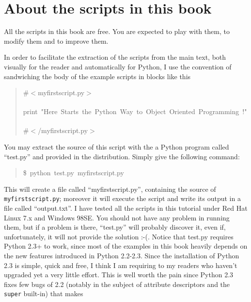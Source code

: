\documentclass[11pt,english]{book}
\begin{document}

\hypertarget{about-the-scripts-in-this-book}{}
\section{About the scripts in this book}

All the scripts  in this book are free. You are expected to play
with them, to modify them and to improve them.

In order to facilitate the extraction of the scripts from the main text, both
visually for the reader and automatically for Python, I use the
convention of sandwiching the body of the example scripts in blocks like this
\begin{quote}
\begin{ttfamily}\begin{flushleft}
\mbox{{\#}{$<$}myfirstscript.py{$>$}}\\
\mbox{}\\
\mbox{print~"Here~Starts~the~Python~Way~to~Object~Oriented~Programming~!"}\\
\mbox{}\\
\mbox{{\#}{$<$}/myfirstscript.py{$>$}}
\end{flushleft}\end{ttfamily}
\end{quote}

You may extract the source of this script with the a Python program
called ``test.py'' and provided in the distribution. Simply give the 
following command:
\begin{quote}
\begin{ttfamily}\begin{flushleft}
\mbox{{\$}~python~test.py~myfirstscript.py}
\end{flushleft}\end{ttfamily}
\end{quote}

This will create a file called ``myfirstscript.py'', containing the
source of \texttt{myfirstscript.py}; moreover it will execute the script 
and write its output in a file called ``output.txt''. I have tested
all the scripts in this tutorial under Red Hat Linux 7.x and 
Windows 98SE. You should not have any problem in running them,
but if a problem is there, ``test.py'' will probably discover it,
even if, unfortunately, it will not provide the solution :-(.
Notice that test.py requires Python 2.3+ to work, since most of
the examples in this book heavily depends on the new features
introduced in Python 2.2-2.3. Since the installation of Python 
2.3 is simple, quick and free, I think I am requiring to my readers
who haven't upgraded yet a very little effort. This is well worth
the pain since Python 2.3 fixes few bugs of 2.2 (notably in the subject of
attribute descriptors and the \texttt{super} built-in) that makes
\end{document}
